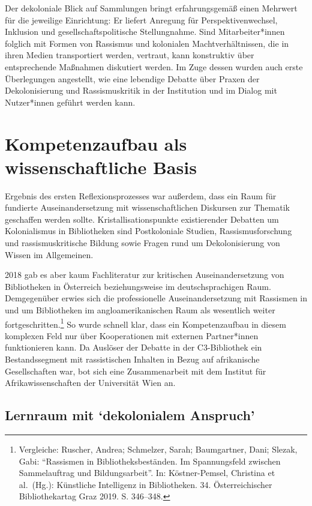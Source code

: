 \documentclass[a4paper,
fontsize=11pt,
oneside,
numbers=noperiodatend,
parskip=half-,
bibliography=totoc,
final
]{scrartcl}
\begin{document}
Der dekoloniale Blick auf Sammlungen bringt erfahrungsgemäß einen
Mehrwert für die jeweilige Einrichtung: Er liefert Anregung für
Perspektivenwechsel, Inklusion und gesellschaftspolitische
Stellungnahme. Sind Mitarbeiter*innen folglich mit Formen von Rassismus
und kolonialen Machtverhältnissen, die in ihren Medien transportiert
werden, vertraut, kann konstruktiv über entsprechende Maßnahmen
diskutiert werden. Im Zuge dessen wurden auch erste Überlegungen
angestellt, wie eine lebendige Debatte über Praxen der Dekolonisierung
und Rassismuskritik in der Institution und im Dialog mit Nutzer*innen
geführt werden kann.

\hypertarget{kompetenzaufbau-als-wissenschaftliche-basis}{%
\section{Kompetenzaufbau als wissenschaftliche
Basis}\label{kompetenzaufbau-als-wissenschaftliche-basis}}

Ergebnis des ersten Reflexionsprozesses war außerdem, dass ein Raum für
fundierte Auseinandersetzung mit wissenschaftlichen Diskursen zur
Thematik geschaffen werden sollte. Kristallisationspunkte existierender
Debatten um Kolonialismus in Bibliotheken sind Postkoloniale Studien,
Rassismusforschung und rassismuskritische Bildung sowie Fragen rund um
Dekolonisierung von Wissen im Allgemeinen.

2018 gab es aber kaum Fachliteratur zur kritischen Auseinandersetzung
von Bibliotheken in Österreich beziehungsweise im deutschsprachigen
Raum. Demgegenüber erwies sich die professionelle Auseinandersetzung mit
Rassismen in und um Bibliotheken im angloamerikanischen Raum als
wesentlich weiter fortgeschritten.\footnote{Vergleiche: Ruscher, Andrea;
  Schmelzer, Sarah; Baumgartner, Dani; Slezak, Gabi: \enquote{Rassismen
  in Bibliotheksbeständen. Im Spannungsfeld zwischen Sammelauftrag und
  Bildungsarbeit}. In: Köstner-Pemsel, Christina et al.~(Hg.):
  Künstliche Intelligenz in Bibliotheken. 34. Österreichischer
  Bibliothekartag Graz 2019. S. 346--348.} So wurde schnell klar, dass
ein Kompetenzaufbau in diesem komplexen Feld nur über Kooperationen mit
externen Partner*innen funktionieren kann. Da Auslöser der Debatte in
der C3-Bibliothek ein Bestandssegment mit rassistischen Inhalten in
Bezug auf afrikanische Gesellschaften war, bot sich eine Zusammenarbeit
mit dem Institut für Afrikawissenschaften der Universität Wien an.

\hypertarget{lernraum-mit-dekolonialem-anspruch}{%
\subsection{\texorpdfstring{Lernraum mit \enquote*{dekolonialem
Anspruch}}{Lernraum mit `dekolonialem Anspruch'}}\label{lernraum-mit-dekolonialem-anspruch}}
\end{document}
